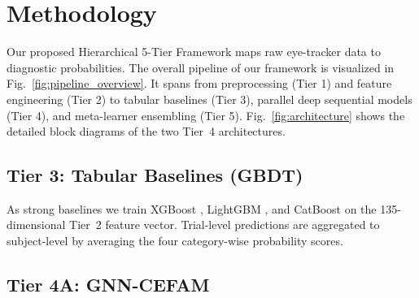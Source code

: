 \section{Methodology}
\label{sec:methodology}

Our proposed Hierarchical 5-Tier Framework maps raw eye-tracker data to diagnostic probabilities. The overall pipeline of our framework is visualized in Fig.~\ref{fig:pipeline_overview}. It spans from preprocessing (Tier 1) and feature engineering (Tier 2) to tabular baselines (Tier 3), parallel deep sequential models (Tier 4), and meta-learner ensembling (Tier 5). Fig.~\ref{fig:architecture} shows the detailed block diagrams of the two Tier~4 architectures.


\subsection{Tier 3: Tabular Baselines (GBDT)}
As strong baselines we train XGBoost \cite{chen2016xgboost}, LightGBM \cite{ke2017lightgbm}, and CatBoost \cite{prokhorenkova2018catboost} on the 135-dimensional Tier~2 feature vector. Trial-level predictions are aggregated to subject-level by averaging the four category-wise probability scores.

\subsection{Tier 4A: GNN-CEFAM}

